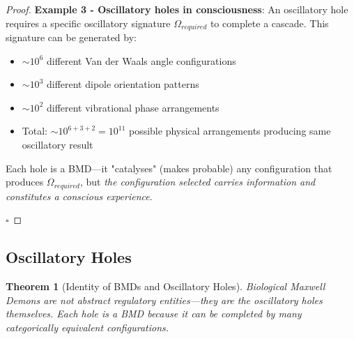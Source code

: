 \documentclass[11pt,a4paper]{article}
\newtheorem{theorem}{Theorem}
\begin{document}
\begin{proof}
\textbf{Example 3 - Oscillatory holes in consciousness}: An oscillatory hole requires a specific oscillatory signature $\Omega_{required}$ to complete a cascade. This signature can be generated by:
\begin{itemize}
\item $\sim 10^6$ different Van der Waals angle configurations
\item $\sim 10^3$ different dipole orientation patterns
\item $\sim 10^2$ different vibrational phase arrangements
\item Total: $\sim 10^{6+3+2} = 10^{11}$ possible physical arrangements producing same oscillatory result
\end{itemize}

Each hole is a BMD—it "catalyses" (makes probable) any configuration that produces $\Omega_{required}$, but \textit{the configuration selected carries information and constitutes a conscious experience}.

$\square$
\end{proof}

\subsection{Oscillatory Holes}

\begin{theorem}[Identity of BMDs and Oscillatory Holes]
\label{thm:bmd_hole_identity}
Biological Maxwell Demons are not abstract regulatory entities—they \textit{are} the oscillatory holes themselves. Each hole is a BMD because it can be completed by many categorically equivalent configurations.
\end{theorem}
\end{document}
